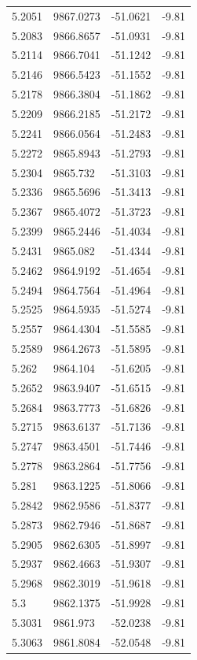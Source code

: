 \begin{table}[H]
\begin{tabular}{llll}
5.2051 & 9867.0273 & -51.0621 & -9.81 \\
5.2083 & 9866.8657 & -51.0931 & -9.81 \\
5.2114 & 9866.7041 & -51.1242 & -9.81 \\
5.2146 & 9866.5423 & -51.1552 & -9.81 \\
5.2178 & 9866.3804 & -51.1862 & -9.81 \\
5.2209 & 9866.2185 & -51.2172 & -9.81 \\
5.2241 & 9866.0564 & -51.2483 & -9.81 \\
5.2272 & 9865.8943 & -51.2793 & -9.81 \\
5.2304 & 9865.732 & -51.3103 & -9.81 \\
5.2336 & 9865.5696 & -51.3413 & -9.81 \\
5.2367 & 9865.4072 & -51.3723 & -9.81 \\
5.2399 & 9865.2446 & -51.4034 & -9.81 \\
5.2431 & 9865.082 & -51.4344 & -9.81 \\
5.2462 & 9864.9192 & -51.4654 & -9.81 \\
5.2494 & 9864.7564 & -51.4964 & -9.81 \\
5.2525 & 9864.5935 & -51.5274 & -9.81 \\
5.2557 & 9864.4304 & -51.5585 & -9.81 \\
5.2589 & 9864.2673 & -51.5895 & -9.81 \\
5.262 & 9864.104 & -51.6205 & -9.81 \\
5.2652 & 9863.9407 & -51.6515 & -9.81 \\
5.2684 & 9863.7773 & -51.6826 & -9.81 \\
5.2715 & 9863.6137 & -51.7136 & -9.81 \\
5.2747 & 9863.4501 & -51.7446 & -9.81 \\
5.2778 & 9863.2864 & -51.7756 & -9.81 \\
5.281 & 9863.1225 & -51.8066 & -9.81 \\
5.2842 & 9862.9586 & -51.8377 & -9.81 \\
5.2873 & 9862.7946 & -51.8687 & -9.81 \\
5.2905 & 9862.6305 & -51.8997 & -9.81 \\
5.2937 & 9862.4663 & -51.9307 & -9.81 \\
5.2968 & 9862.3019 & -51.9618 & -9.81 \\
5.3 & 9862.1375 & -51.9928 & -9.81 \\
5.3031 & 9861.973 & -52.0238 & -9.81 \\
5.3063 & 9861.8084 & -52.0548 & -9.81 \\

\end{tabular}
\end{table}
